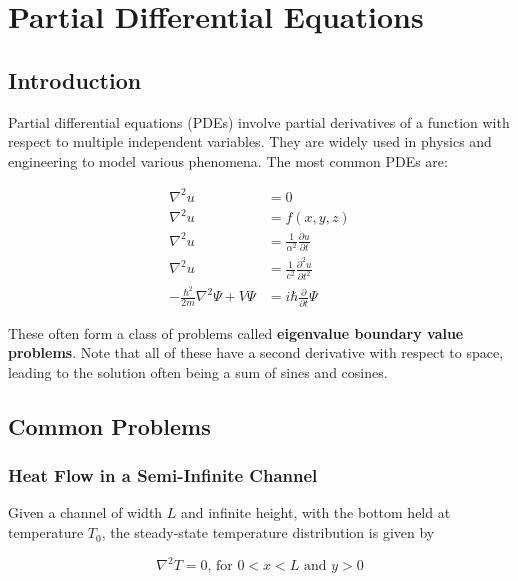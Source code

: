 \section{Partial Differential Equations}

\subsection{Introduction}

Partial differential equations (PDEs) involve partial derivatives of a function with respect to multiple independent variables. They are widely used in physics and engineering to model various phenomena. The most common PDEs are:

\begin{align*}
    \nabla^2 u                               & = 0 \tag {Laplace's equation}                                            \\
    \nabla^2 u                               & = f(x, y, z) \tag {Poisson's equation}                                   \\
    \nabla^2 u                               & = \frac{1}{\alpha^2}\frac{\partial u}{\partial t}  \tag {Heat equation}  \\
    \nabla^2 u                               & = \frac{1}{c^2}\frac{\partial^2 u}{\partial t^2} \tag {Wave equation}    \\
    -\frac{\hbar^2}{2m}\nabla^2 \Psi + V\Psi & = i\hbar\frac{\partial}{\partial t} \Psi \tag {Schr\"odinger's equation}
\end{align*}

These often form a class of problems called \textbf{eigenvalue boundary value problems}. Note that all of these have a second derivative with respect to space, leading to the solution often being a sum of sines and cosines.

\subsection{Common Problems}

\subsubsection{Heat Flow in a Semi-Infinite Channel}

Given a channel of width $L$ and infinite height, with the bottom held at temperature $T_0$, the steady-state temperature distribution is given by

\begin{equation*}
    \nabla^2 T = 0\text{, for } 0 < x < L \text{ and } y > 0
\end{equation*}

